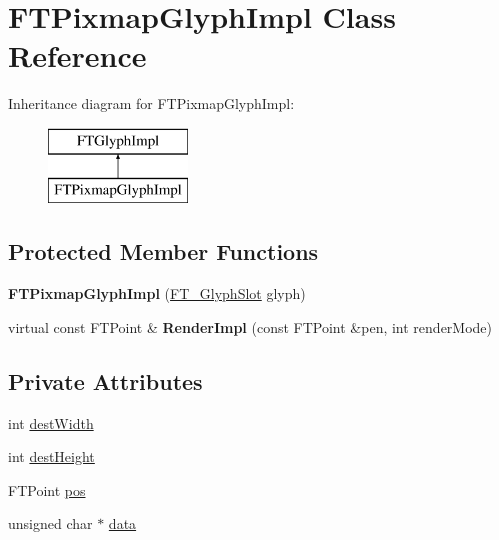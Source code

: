 \hypertarget{class_f_t_pixmap_glyph_impl}{}\section{F\+T\+Pixmap\+Glyph\+Impl Class Reference}
\label{class_f_t_pixmap_glyph_impl}
Inheritance diagram for F\+T\+Pixmap\+Glyph\+Impl\+:\begin{figure}[H]
\begin{center}
\leavevmode
\includegraphics[height=2.000000cm]{class_f_t_pixmap_glyph_impl}
\end{center}
\end{figure}
\subsection*{Protected Member Functions}
\begin{DoxyCompactItemize}
\item 
{\bfseries F\+T\+Pixmap\+Glyph\+Impl} (\hyperlink{struct_f_t___glyph_slot_rec__}{F\+T\+\_\+\+Glyph\+Slot} glyph)\hypertarget{class_f_t_pixmap_glyph_impl_a65e1773b7c1f422abbccd90399cd3ec4}{}\label{class_f_t_pixmap_glyph_impl_a65e1773b7c1f422abbccd90399cd3ec4}

\item 
virtual const F\+T\+Point \& {\bfseries Render\+Impl} (const F\+T\+Point \&pen, int render\+Mode)\hypertarget{class_f_t_pixmap_glyph_impl_a9c5cf9105b59301f0b27cfa2350012c6}{}\label{class_f_t_pixmap_glyph_impl_a9c5cf9105b59301f0b27cfa2350012c6}

\end{DoxyCompactItemize}
\subsection*{Private Attributes}
\begin{DoxyCompactItemize}
\item 
int \hyperlink{class_f_t_pixmap_glyph_impl_a04c6246e9f35ac10b8c994d998f5b8c7}{dest\+Width}
\item 
int \hyperlink{class_f_t_pixmap_glyph_impl_a6a0513a5a517e50ac0516b3f61f80605}{dest\+Height}
\item 
F\+T\+Point \hyperlink{class_f_t_pixmap_glyph_impl_a51d15a72172389c6f50c2ae5a023044a}{pos}
\item 
unsigned char $\ast$ \hyperlink{class_f_t_pixmap_glyph_impl_aca6f17adecedb7beb8a98f90b1a1bba6}{data}
\end{DoxyCompactItemize}

